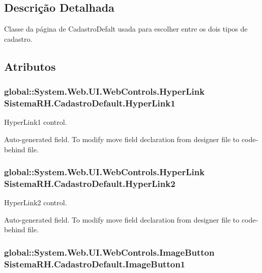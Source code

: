 \subsection{Descrição Detalhada}
Classe da página de CadastroDefalt usada para escolher entre os dois tipos de cadastro. 

\subsection{Atributos}
\hypertarget{class_sistema_r_h_1_1_cadastro_default_a504974069b7c2282e0e81e4d22c85045}{
\subsubsection[{HyperLink1}]{\setlength{\rightskip}{0pt plus 5cm}global::System.Web.UI.WebControls.HyperLink {\bf SistemaRH.CadastroDefault.HyperLink1}}}
\label{class_sistema_r_h_1_1_cadastro_default_a504974069b7c2282e0e81e4d22c85045}


HyperLink1 control. 

Auto-\/generated field. To modify move field declaration from designer file to code-\/behind file. \hypertarget{class_sistema_r_h_1_1_cadastro_default_ab2b423dbaab5b2a580256786c5d491b8}{
\subsubsection[{HyperLink2}]{\setlength{\rightskip}{0pt plus 5cm}global::System.Web.UI.WebControls.HyperLink {\bf SistemaRH.CadastroDefault.HyperLink2}}}
\label{class_sistema_r_h_1_1_cadastro_default_ab2b423dbaab5b2a580256786c5d491b8}


HyperLink2 control. 

Auto-\/generated field. To modify move field declaration from designer file to code-\/behind file. \hypertarget{class_sistema_r_h_1_1_cadastro_default_a4159df0797993e5cdcd157bee1f45d39}{
\subsubsection[{ImageButton1}]{\setlength{\rightskip}{0pt plus 5cm}global::System.Web.UI.WebControls.ImageButton {\bf SistemaRH.CadastroDefault.ImageButton1}}}
\label{class_sistema_r_h_1_1_cadastro_default_a4159df0797993e5cdcd157bee1f45d39}


